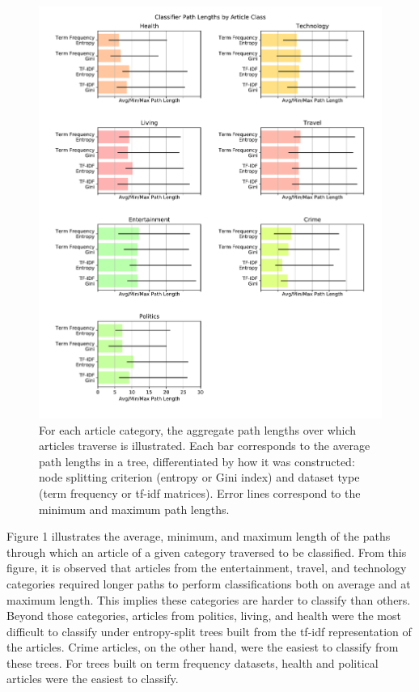 \documentclass[11pt]{article}
\begin{document}
\begin{figure}[h!] \label{fig:pathlengths}
  \centering
  \includegraphics[width=\textwidth]{figures/decision_tree/path_depths}
  \caption{For each article category, the aggregate path lengths over which articles traverse is illustrated.
  Each bar corresponds to the average path lengths in a tree, differentiated by how it was constructed: node splitting criterion (entropy or Gini index) and dataset type (term frequency or tf-idf matrices).
  Error lines correspond to the minimum and maximum path lengths.}
\end{figure}


Figure 1 illustrates the average, minimum, and maximum length of the paths through which an article of a given category traversed to be classified.
From this figure, it is observed that articles from the entertainment, travel, and technology categories required longer paths to perform classifications both on average and at maximum length.
This implies these categories are harder to classify than others.
Beyond those categories, articles from politics, living, and health were the most difficult to classify under entropy-split trees built from the tf-idf representation of the articles.
Crime articles, on the other hand, were the easiest to classify from these trees.
For trees built on term frequency datasets, health and political articles were the easiest to classify.
\end{document}
